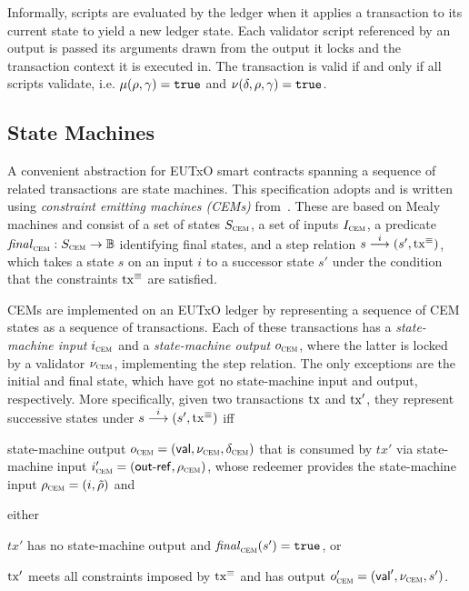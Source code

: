 Informally, scripts are evaluated by the ledger when it applies a transaction to
its current state to yield a new ledger state. Each validator script referenced
by an output is passed its arguments drawn from the output it locks and the
transaction context it is executed in. The transaction is valid if and only if
all scripts validate, i.e. $\mu(\rho, \gamma) = \mathtt{true}$ and
$\nu(\delta, \rho, \gamma) = \mathtt{true}$.

\subsection{State Machines}\label{sec:cem}

A convenient abstraction for EUTxO smart contracts spanning a sequence of
related transactions are state machines. This specification adopts and is
written using \emph{constraint emitting machines (CEMs)} from~\cite{eutxo}.
These are based on Mealy machines and consist of a set of states $S_{\textsc{cem}}$, a set
of inputs $I_{\textsc{cem}}$, a predicate \(\mathit{final}_{\textsc{cem}} : S_{\textsc{cem}}\to\mathbb{B}\) identifying final
states, and a step relation \({s}\overset{i}\longrightarrow(s', \mathrm{tx}^\equiv)\), which takes a
state $s$ on an input $i$ to a successor state $s'$ under the condition that the
constraints $\mathrm{tx}^\equiv$ are satisfied.

CEMs are implemented on an EUTxO ledger by representing a sequence of CEM states
as a sequence of transactions. Each of these transactions has a
\emph{state-machine input} $i_{\textsc{cem}}$ and a \emph{state-machine output} $o_{\textsc{cem}}$,
where the latter is locked by a validator $\nu_{\textsc{cem}}$, implementing the step
relation. The only exceptions are the initial and final state, which have got no
state-machine input and output, respectively. More specifically, given two
transactions $\mathrm{tx}$ and $\mathrm{tx}'$, they represent successive states under
\({s}\overset{i}\longrightarrow(s', \mathrm{tx}^\equiv)\) iff

\begin{mitemize}
  \item state-machine output $o_{\textsc{cem}} = (\mathsf{val}, \nu_{\textsc{cem}}, \delta_{\textsc{cem}})$ that
  is consumed by $tx'$ via state-machine input
  $i_{\textsc{cem}}' = (\mathsf{out\textsf{-}{}ref}, \rho_{\textsc{cem}})$, whose redeemer provides the
  state-machine input $\rho_{\textsc{cem}} = (i, \tilde{\rho})$ and
  \item either
    \begin{mitemize}
      \item $tx'$ has no state-machine output and $\mathit{final}_{\textsc{cem}}(s') = \mathtt{true}$, or
      \item $\mathrm{tx}'$ meets all constraints imposed by $\mathrm{tx}^\equiv$ and has output
      $o_{\textsc{cem}}' = (\mathsf{val}', \nu_{\textsc{cem}}, s')$.
    \end{mitemize}
\end{mitemize}

